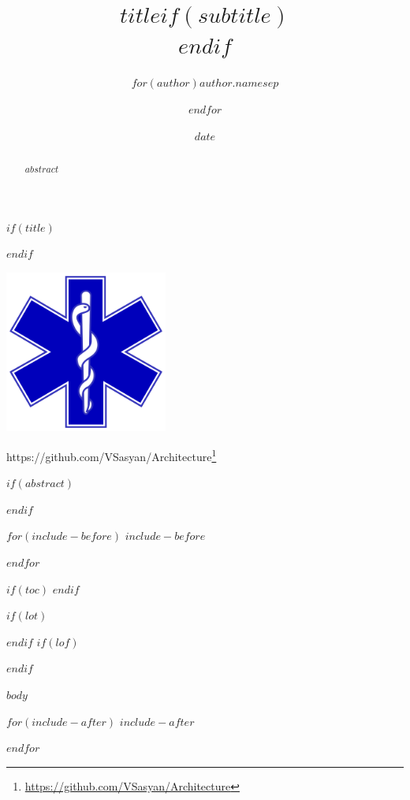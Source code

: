 \documentclass[
$if(fontsize)$$fontsize$,$endif$
french,                           %
$if(papersize)$$papersize$,$endif$
$for(classoption)$$classoption$$sep$,$endfor$]{$documentclass$}
\title{$title$$if(subtitle)$\\\vspace{0.5em}{\large $subtitle$}$endif$}
\author{$for(author)$$author.name$$sep$ \and $endfor$}
\date{$date$}
\renewcommand{\href}[2]{#2\footnote{\url{#1}}}
\begin{document}
$if(title)$
\maketitle
$endif$

\bigskip

\begin{center}
  \includegraphics[width=0.4\textwidth]{logo-samu}
\end{center}

\bigskip

\begin{center}
  \href{https://github.com/VSasyan/Architecture}{https://github.com/VSasyan/Architecture}
\end{center}

\clearpage

$if(abstract)$
\begin{abstract}
$abstract$
\end{abstract}
$endif$

$for(include-before)$
$include-before$

$endfor$

$if(toc)$
{
  \hypersetup{linkcolor=$if(toccolor)$$toccolor$$else$black$endif$}
  \setcounter{tocdepth}{$toc-depth$}
  \tableofcontents
}
$endif$

$if(lot)$
\listoftables
$endif$
$if(lof)$
\listoffigures
$endif$

\clearpage
$body$

$for(include-after)$
$include-after$

$endfor$
\end{document}
